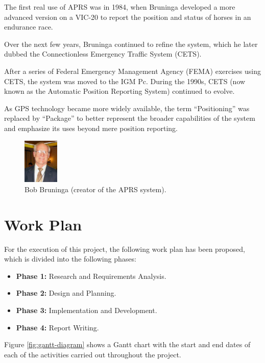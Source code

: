 The first real use of APRS was in 1984, when Bruninga developed a more advanced version on a VIC-20 to report the position and status of horses in an endurance race.

Over the next few years, Bruninga continued to refine the system, which he later dubbed the Connectionless Emergency Traffic System (CETS).

After a series of Federal Emergency Management Agency (FEMA) exercises using CETS, the system was moved to the IGM Pc. During the 1990s, CETS (now known as the Automatic Position Reporting System) continued to evolve.

As GPS technology became more widely available, the term ``Positioning'' was replaced by ``Package'' to better represent the broader capabilities of the system and emphasize its uses beyond mere position reporting.

\begin{figure}[h]
	\centering
	\includegraphics[width=0.15\textwidth]{Imagenes/Chapter_1/bob_bruninga.png}
	\caption{Bob Bruninga (creator of the APRS system).}
	\label{fig:bob-bruninga}
\end{figure}

\section{Work Plan}

For the execution of this project, the following work plan has been proposed, which is divided into the following phases:

\begin{itemize}
	\item \textbf{Phase 1:} Research and Requirements Analysis.
	\item \textbf{Phase 2:} Design and Planning.
	\item \textbf{Phase 3:} Implementation and Development.
	\item \textbf{Phase 4:} Report Writing.
\end{itemize}

Figure \ref{fig:gantt-diagram} shows a Gantt chart with the start and end dates of each of the activities carried out throughout the project.

